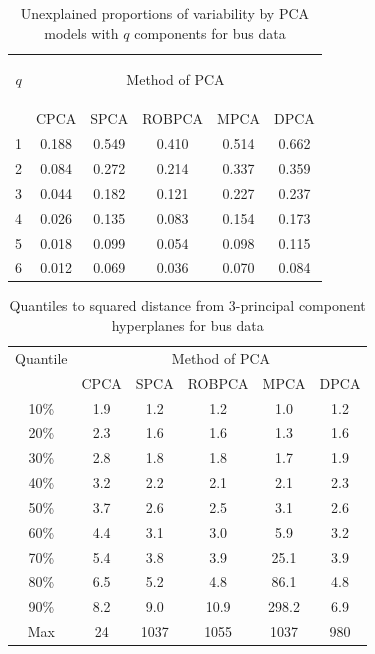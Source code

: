 \documentclass[fleqn,11pt]{article}
\begin{document}
\begin{table}[t]
\centering
    \begin{tabular}{c|ccccc}
    \hline
    \begin{large} $q$ \end{large} & \multicolumn{5}{c}{Method of PCA}         \\ \cline{2-6}
    ~                   & CPCA     & SPCA & ROBPCA & MPCA & DPCA \\\hline 
    1                   & 0.188         & 0.549     & 0.410  & 0.514     & 0.662     \\
    2                   & 0.084         & 0.272     & 0.214  & 0.337     & 0.359     \\
    3                   & 0.044         & 0.182     & 0.121  & 0.227     & 0.237     \\
    4                   & 0.026         & 0.135     & 0.083  & 0.154     & 0.173     \\
    5                   & 0.018         & 0.099     & 0.054  & 0.098     & 0.115     \\
    6                   & 0.012         & 0.069     & 0.036  & 0.070     & 0.084     \\ \hline
    \end{tabular}
    \caption{Unexplained proportions of variability by PCA models with $q$ components for bus data}
    \label{table:bus_table1}
\end{table}

\begin{table}[t]
\centering
    \begin{tabular}{c|ccccc}
    \hline
    Quantile & \multicolumn{5}{c}{Method of PCA}         \\ \cline{2-6}
    ~                   & CPCA     & SPCA & ROBPCA & MPCA & DPCA \\\hline 
    10\%      & 1.9       & 1.2       & 1.2    & 1.0       & 1.2       \\
    20\%      & 2.3       & 1.6       & 1.6    & 1.3       & 1.6       \\
    30\%      & 2.8       & 1.8       & 1.8    & 1.7       & 1.9       \\
    40\%      & 3.2       & 2.2       & 2.1    & 2.1       & 2.3       \\
    50\%      & 3.7       & 2.6       & 2.5    & 3.1       & 2.6       \\
    60\%      & 4.4       & 3.1       & 3.0    & 5.9       & 3.2       \\
    70\%      & 5.4       & 3.8       & 3.9    & 25.1      & 3.9       \\
    80\%      & 6.5       & 5.2       & 4.8    & 86.1      & 4.8       \\
    90\%      & 8.2       & 9.0       & 10.9   & 298.2     & 6.9      \\
    Max       & 24        & 1037      & 1055   & 1037      & 980      \\\hline
    \end{tabular}
    \caption{Quantiles to squared distance from 3-principal component hyperplanes for bus data}
    \label{table:bus_table2}
\end{table}
\end{document}
